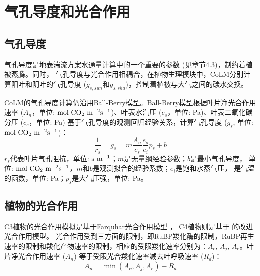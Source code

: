 \chapter{气孔导度和光合作用}


\section{气孔导度}\label{气孔导度}
气孔导度是地表湍流方案水通量计算中的一个重要的参数 (见章节4.3)，制约着植被蒸腾。同时，
气孔导度与光合作用相耦合，在植物生理模块中，CoLM分别计算阳叶和阴叶的气孔导度 ($g_{s,sun}$和$g_{s,sha}$)，控制着植被与大气之间的碳水交换。


CoLM的气孔导度计算仍沿用Ball-Berry模型。Ball-Berry模型根据叶片净光合作用速率 
($A_n$，单位: $\rm mol\ CO_2\ m^{-2}s^{-1}$)、叶表水汽压 ($e_s$，单位: Pa)、叶表二氧化碳分压 ($c_s$，单位: Pa) 
基于气孔导度的观测回归经验关系，计算气孔导度 ($g_s$, 单位: $\rm mol\ CO_2\ m^{-2}s^{-1}$)： 
\begin{equation}\label{rs_a1}
\frac{1}{r_{s}}=g_{s}=m \frac{A_{n}}{c_{s}} \frac{e_{s}}{e_{i}} p_{s}+b
\end{equation}
$r_s$代表叶片气孔阻抗，单位: $\rm s\ m^{-1}$；$m$是无量纲经验参数；$b$是最小气孔导度，
单位: $\rm mol\ CO_2\ m^{-2}s^{-1}$，$m$和$b$是观测拟合的经验系数；$e_i$是饱和水蒸气压，
是气温的函数，单位: Pa；$p_s$是大气压强，单位: Pa。
\section{植物的光合作用}\label{植物的光合作用}
C3植物的光合作用模拟是基于Farquhar光合作用模型 \citep{farquhar1980biochemical} ，
C4植物则是基于\citet{collatz1992} 的改进光合作用模型。
光合作用受到三方面的限制，即RuBP羧化酶的限制，RuBP再生速率的限制和羧化产物速率的限制，相应的受限羧化速率分别为：$A_{c}$, $A_{j}$, $A_{e}$。叶片净光合作用速率 ($A_{n}$) 等于受限光合羧化速率减去叶呼吸速率 ($R_d$)：
\begin{equation}\label{An1}
A_{n}=\min \left(A_{c}, A_{j}, A_{e}\right)-R_{d}
\end{equation}


